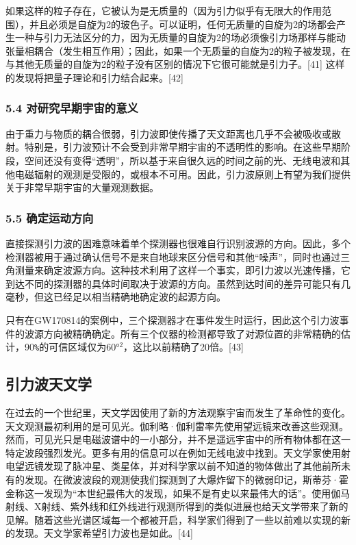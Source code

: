 如果这样的粒子存在，它被认为是无质量的（因为引力似乎有无限大的作用范围），并且必须是自旋为2的玻色子。可以证明，任何无质量的自旋为2的场都会产生一种与引力无法区分的力，因为无质量的自旋为2的场必须像引力场那样与能动张量相耦合（发生相互作用）；因此，如果一个无质量的自旋为2的粒子被发现，在与其他无质量的自旋为2的粒子没有区别的情况下它很可能就是引力子。[41] 这样的发现将把量子理论和引力结合起来。[42]

\subsubsection{5.4 对研究早期宇宙的意义}

由于重力与物质的耦合很弱，引力波即使传播了天文距离也几乎不会被吸收或散射。特别是，引力波预计不会受到非常早期宇宙的不透明性的影响。在这些早期阶段，空间还没有变得“透明”，所以基于来自很久远的时间之前的光、无线电波和其他电磁辐射的观测是受限的，或根本不可用。因此，引力波原则上有望为我们提供关于非常早期宇宙的大量观测数据。

\subsubsection{5.5 确定运动方向}

直接探测引力波的困难意味着单个探测器也很难自行识别波源的方向。因此，多个检测器被用于通过确认信号不是来自地球来区分信号和其他“噪声”，同时也通过三角测量来确定波源方向。这种技术利用了这样一个事实，即引力波以光速传播，它到达不同的探测器的具体时间取决于波源的方向。虽然到达时间的差异可能只有几毫秒，但这已经足以相当精确地确定波的起源方向。

只有在GW170814的案例中，三个探测器才在事件发生时运行，因此这个引力波事件的波源方向被精确确定。所有三个仪器的检测都导致了对源位置的非常精确的估计，90\verb|%|的可信区域仅为60°$^{2}$，这比以前精确了20倍。[43]

\subsection{引力波天文学}

在过去的一个世纪里，天文学因使用了新的方法观察宇宙而发生了革命性的变化。天文观测最初利用的是可见光。伽利略·伽利雷率先使用望远镜来改善这些观测。然而，可见光只是电磁波谱中的一小部分，并不是遥远宇宙中的所有物体都在这一特定波段强烈发光。更多有用的信息可以在例如无线电波中找到。天文学家使用射电望远镜发现了脉冲星、类星体，并对科学家以前不知道的物体做出了其他前所未有的发现。在微波波段的观测使我们探测到了大爆炸留下的微弱印记，斯蒂芬·霍金称这一发现为“本世纪最伟大的发现，如果不是有史以来最伟大的话”。使用伽马射线、X射线、紫外线和红外线进行观测所得到的类似进展也给天文学带来了新的见解。随着这些光谱区域每一个都被开启，科学家们得到了一些以前难以实现的新的发现。天文学家希望引力波也是如此。[44]


